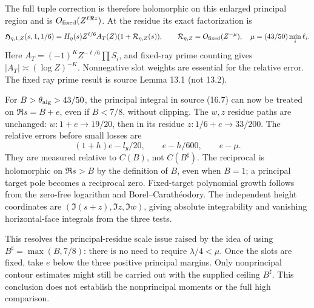\documentclass[12pt]{article}
\begin{document}
The full tuple correction is therefore holomorphic on this enlarged
principal region and is \(O_{\rm fixed}(Z^{\ell\Re z})\).
At the residue its exact factorization is
\[
 \mathfrak H_{\eta,1,Z}(s,1,1/6)
 =H_\eta(s)Z^{\ell/6}A_T(Z)(1+\mathcal R_{\eta,Z}(s)),
 \qquad
 \mathcal R_{\eta,Z}=O_{\rm fixed}(Z^{-\mu}),\quad
 \mu=(43/50)\min_i\ell_i.
\]
Here \(A_T=(-1)^KZ^{-\ell/6}\prod S_i\), and fixed-ray prime
counting gives \(|A_T|\asymp(\log Z)^{-K}\).
Nonnegative slot weights are essential for the relative error.
The fixed ray prime result is source Lemma 13.1 (not 13.2).

For \(B>\theta_{\rm alg}>43/50\), the principal integral in
source (16.7) can now be treated on \(\Re s=B+e\), even if
\(B<7/8\), without clipping.  The \(w,z\) residue paths are unchanged:
\(w:1+e\to19/20\), then in its residue \(z:1/6+e\to33/200\).
The relative errors before small losses are
\[
 (1+h)e-l_y/20,\qquad e-h/600,\qquad e-\mu .
\]
They are measured relative to \(C(B)\), not \(C(B^\sharp)\).
The reciprocal is holomorphic on \(\Re s>B\) by the definition of
\(B\), even when \(B=1\); a principal target pole becomes a reciprocal
zero.  Fixed-target polynomial growth follows from the zero-free
logarithm and Borel--Carath\'eodory.  The independent height coordinates
are \((\Im(s+z),\Im z,\Im w)\), giving absolute integrability and
vanishing horizontal-face integrals from the three tests.

This resolves the principal-residue scale issue raised by the idea of
using \(B^\sharp=\max(B,7/8)\): there is no need to require
\(\lambda/4<\mu\).  Once the slots are fixed, take \(e\) below the
three positive principal margins.  Only nonprincipal contour estimates
might still be carried out with the supplied ceiling \(B^\sharp\).
This conclusion does not establish the nonprincipal moments or the
full high comparison.
\end{document}
